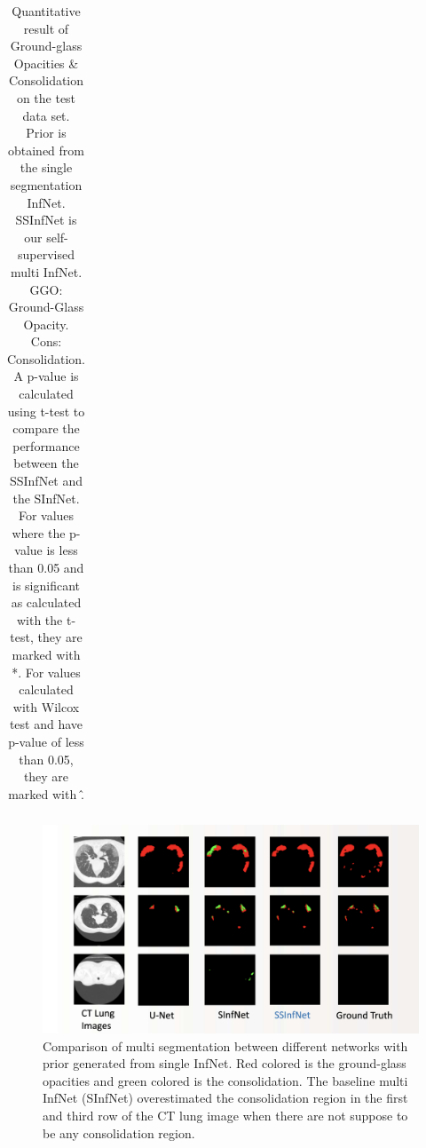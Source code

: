 \begin{table}[!h]
\begin{tabular}{ |c|c|c|c|c|c|c|c| }
	\end{tabular}
\caption{Quantitative result of Ground-glass Opacities \& Consolidation on the test data set. Prior is obtained from the single segmentation InfNet. SSInfNet is our self-supervised multi InfNet. GGO: Ground-Glass Opacity. Cons: Consolidation. A p-value is calculated using t-test to compare the performance between the SSInfNet and the SInfNet. For values where the p-value is less than 0.05 and is significant as calculated with the t-test, they are marked with *. For values calculated with Wilcox test and have p-value of less than 0.05, they are marked with \^. }
\label{tab:multi-weakprior}
\end{table}


  \begin{figure}
 	\includegraphics[width=\linewidth]{comparison_multi_weakprior.png}
 	\caption{Comparison of multi segmentation between different networks with prior generated from single InfNet. Red colored is the ground-glass opacities and green colored is the consolidation. The baseline multi InfNet (SInfNet) overestimated the consolidation region in the first and third row of the CT lung image when there are not suppose to be any consolidation region.}
 	\label{fig:multi-weakprior-comparison}
 \end{figure}
